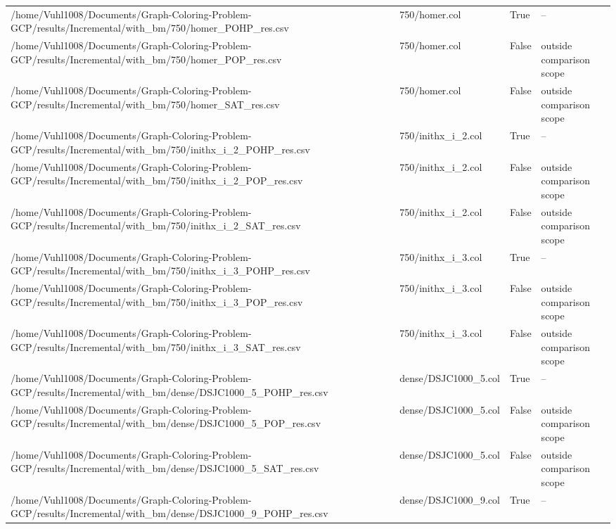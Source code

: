 \begin{table}[htbp]
\begin{tabular}{llll}
/home/Vuhl1008/Documents/Graph-Coloring-Problem-GCP/results/Incremental/with\_bm/750/homer\_POHP\_res.csv & 750/homer.col & True & -- \\
/home/Vuhl1008/Documents/Graph-Coloring-Problem-GCP/results/Incremental/with\_bm/750/homer\_POP\_res.csv & 750/homer.col & False & outside comparison scope \\
/home/Vuhl1008/Documents/Graph-Coloring-Problem-GCP/results/Incremental/with\_bm/750/homer\_SAT\_res.csv & 750/homer.col & False & outside comparison scope \\
/home/Vuhl1008/Documents/Graph-Coloring-Problem-GCP/results/Incremental/with\_bm/750/inithx\_i\_2\_POHP\_res.csv & 750/inithx\_i\_2.col & True & -- \\
/home/Vuhl1008/Documents/Graph-Coloring-Problem-GCP/results/Incremental/with\_bm/750/inithx\_i\_2\_POP\_res.csv & 750/inithx\_i\_2.col & False & outside comparison scope \\
/home/Vuhl1008/Documents/Graph-Coloring-Problem-GCP/results/Incremental/with\_bm/750/inithx\_i\_2\_SAT\_res.csv & 750/inithx\_i\_2.col & False & outside comparison scope \\
/home/Vuhl1008/Documents/Graph-Coloring-Problem-GCP/results/Incremental/with\_bm/750/inithx\_i\_3\_POHP\_res.csv & 750/inithx\_i\_3.col & True & -- \\
/home/Vuhl1008/Documents/Graph-Coloring-Problem-GCP/results/Incremental/with\_bm/750/inithx\_i\_3\_POP\_res.csv & 750/inithx\_i\_3.col & False & outside comparison scope \\
/home/Vuhl1008/Documents/Graph-Coloring-Problem-GCP/results/Incremental/with\_bm/750/inithx\_i\_3\_SAT\_res.csv & 750/inithx\_i\_3.col & False & outside comparison scope \\
/home/Vuhl1008/Documents/Graph-Coloring-Problem-GCP/results/Incremental/with\_bm/dense/DSJC1000\_5\_POHP\_res.csv & dense/DSJC1000\_5.col & True & -- \\
/home/Vuhl1008/Documents/Graph-Coloring-Problem-GCP/results/Incremental/with\_bm/dense/DSJC1000\_5\_POP\_res.csv & dense/DSJC1000\_5.col & False & outside comparison scope \\
/home/Vuhl1008/Documents/Graph-Coloring-Problem-GCP/results/Incremental/with\_bm/dense/DSJC1000\_5\_SAT\_res.csv & dense/DSJC1000\_5.col & False & outside comparison scope \\
/home/Vuhl1008/Documents/Graph-Coloring-Problem-GCP/results/Incremental/with\_bm/dense/DSJC1000\_9\_POHP\_res.csv & dense/DSJC1000\_9.col & True & -- \\

\end{tabular}
\end{table}
